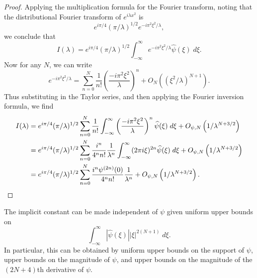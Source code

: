 \begin{comment}
IDEA: Sum up dyadically on intervals $|x| \sim 2^k \lambda^{-1/2}$, for $k = 1$ to $k = \lfloor \log( \lambda^{1/2} \varepsilon) - 2 \rfloor$, then hopefully the oscillatory integral with phase $x^2$ and amplitude $\psi(x) \sum_{k = \lfloor \lg(\lambda^{1/2} \varepsilon) - 2 \rfloor}^\infty \beta_k(x/\lambda^{1/2})$ decays arbitrarily fast in $\lambda$?


Then for each $n$, define $\beta_n(x) = \alpha(x/2^n) - \alpha(x/2^{n-1})$. Thus we have $\alpha(x) + \sum_{k = 1}^\infty \beta_k(x) = 1$ for all $x \in \RR$. Moreover, $\beta_k$ is supported on $[-2^n, -$

\end{comment}
\begin{proof}
  Applying the multiplication formula for the Fourier transform, noting that the distributional Fourier transform of $e^{i \lambda x^2}$ is
  \[ e^{i \pi / 4} (\pi/\lambda)^{1/2} e^{-i \pi^2 \xi^2 / \lambda}, \]
  we conclude that
  \[ I(\lambda) = e^{i \pi / 4} (\pi/\lambda)^{1/2} \int_{-\infty}^\infty e^{-i \pi^2 \xi^2 / \lambda} \widehat{\psi}(\xi)\; d\xi. \]
  Now for any $N$, we can write
  \[ e^{-i \pi^2 \xi^2 / \lambda} = \sum_{n = 0}^N \frac{1}{n!} \left( \frac{-i \pi^2 \xi^2}{\lambda} \right)^n + O_N \left( (\xi^2 / \lambda)^{N+1} \right). \]
  Thus substituting in the Taylor series, and then applying the Fourier inversion formula, we find
  \begin{align*}
    I(\lambda) &= e^{i \pi / 4} (\pi/\lambda)^{1/2} \sum_{n = 0}^N \frac{1}{n!} \int_{-\infty}^\infty \left( \frac{-i \pi^2 \xi^2}{\lambda} \right)^n \widehat{\psi}(\xi)\; d\xi + O_{\psi,N} \left( 1/\lambda^{N+3/2}  \right)\\
    &= e^{i \pi / 4} (\pi/\lambda)^{1/2} \sum_{n = 0}^N \frac{i^n}{4^n n!} \frac{1}{\lambda^n} \int_{-\infty}^\infty (2\pi i \xi)^{2n} \widehat{\psi}(\xi)\; d\xi + O_{\psi,N} \left( 1 / \lambda^{N+3/2} \right)\\
    &= e^{i \pi / 4} (\pi/\lambda)^{1/2} \sum_{n = 0}^N \frac{i^n \psi^{(2n)}(0)}{4^n n!} \frac{1}{\lambda^n} + O_{\psi,N} \left( 1 / \lambda^{N+3/2} \right). \qedhere
  \end{align*}
\end{proof}

\begin{remark}
  The implicit constant can be made independent of $\psi$ given uniform upper bounds on
  \[ \int_{-\infty}^\infty |\widehat{\psi}(\xi)| |\xi|^{2(N+1)}\; d\xi. \]
  In particular, this can be obtained by uniform upper bounds on the support of $\psi$, upper bounds on the magnitude of $\psi$, and upper bounds on the magnitude of the $(2N+4)$th derivative of $\psi$.
\end{remark}

